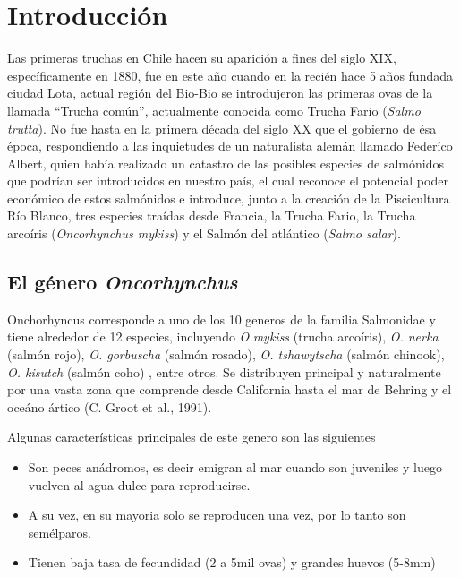 \documentclass[12pt,a4paper,]{article}
\begin{document}
\clearpage

\section{Introducción}\label{introducciuxf3n}

Las primeras truchas en Chile hacen su aparición a fines del siglo XIX,
específicamente en 1880, fue en este año cuando en la recién hace 5 años
fundada ciudad Lota, actual región del Bio-Bio se introdujeron las
primeras ovas de la llamada ``Trucha común'', actualmente conocida como
Trucha Fario (\emph{Salmo trutta}). No fue hasta en la primera década
del siglo XX que el gobierno de ésa época, respondiendo a las
inquietudes de un naturalista alemán llamado Federíco Albert, quien
había realizado un catastro de las posibles especies de salmónidos que
podrían ser introducidos en nuestro país, el cual reconoce el potencial
poder económico de estos salmónidos e introduce, junto a la creación de
la Piscicultura Río Blanco, tres especies traídas desde Francia, la
Trucha Fario, la Trucha arcoíris (\emph{Oncorhynchus mykiss}) y el
Salmón del atlántico (\emph{Salmo salar}).

\subsection{El género
\emph{Oncorhynchus}}\label{el-guxe9nero-oncorhynchus}

Onchorhyncus corresponde a uno de los 10 generos de la familia
Salmonidae y tiene alrededor de 12 especies, incluyendo \emph{O.mykiss}
(trucha arcoíris), \emph{O. nerka} (salmón rojo), \emph{O. gorbuscha}
(salmón rosado), \emph{O. tshawytscha} (salmón chinook), \emph{O.
kisutch} (salmón coho) , entre otros. Se distribuyen principal y
naturalmente por una vasta zona que comprende desde California hasta el
mar de Behring y el oceáno ártico (C. Groot et al., 1991).

Algunas características principales de este genero son las siguientes

\begin{itemize}
\itemsep1pt\parskip0pt
\item
  Son peces anádromos, es decir emigran al mar cuando son juveniles y
  luego vuelven al agua dulce para reproducirse.
\item
  A su vez, en su mayoria solo se reproducen una vez, por lo tanto son
  semélparos.
\item
  Tienen baja tasa de fecundidad (2 a 5mil ovas) y grandes huevos
  (5-8mm)
\end{itemize}
\end{document}
